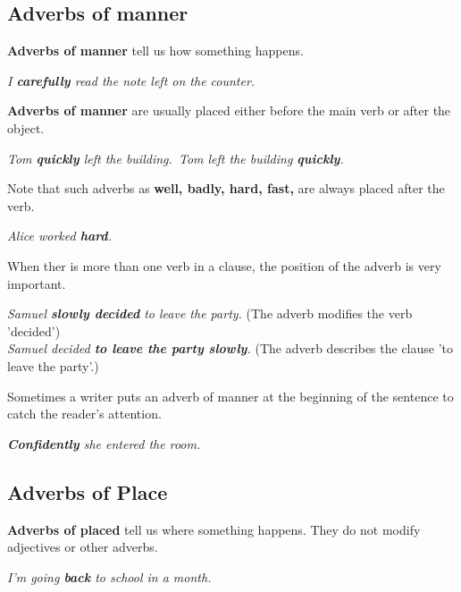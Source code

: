 \documentclass[hidelinks,10pt,a4paper]{article}
\begin{document}
\subsection{Adverbs of manner}
\textbf{Adverbs of manner} tell us how something happens.

\begin{center}
	\textit{I \textbf{carefully} read the note left on the counter.}
\end{center}

\textbf{Adverbs of manner} are usually placed either before the main verb or after the object.

\begin{center}
	\textit{Tom \textbf{quickly} left the building.\
	Tom left the building \textbf{quickly}. }
\end{center}

Note that such adverbs as \textbf{well, badly, hard, fast,} are always placed after the verb.

\begin{center}
	\textit{  Alice worked \textbf{hard}.}
\end{center}
When ther is more than one verb in a clause, the position of the adverb is very important.

\begin{center}
	\textit{Samuel \textbf{slowly decided} to leave the party.} (The adverb modifies the verb 'decided')\\
	\textit{Samuel decided \textbf{to leave the party slowly}.} (The adverb describes the clause 'to leave the party'.)
\end{center}

Sometimes a writer puts an adverb of manner at the beginning of the sentence to catch the reader's attention.

\begin{center}
	\textit{\textbf{Confidently} she entered the room.}
\end{center}

\subsection{Adverbs of Place}
\textbf{Adverbs of placed} tell us where something happens. They do not modify adjectives or other adverbs.

\begin{center}
	\textit{I'm going \textbf{back} to school in a month.}
\end{center}
\end{document}
